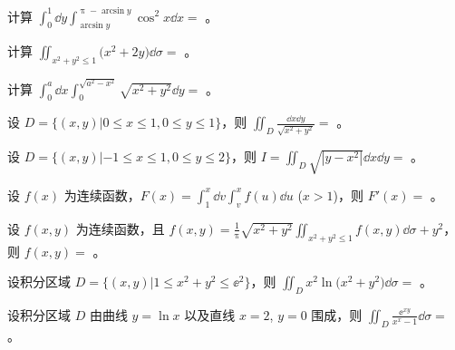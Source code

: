 \begin{ti}
	计算 $\int_0^1 \dd{y} \int_{\arcsin y}^{\uppi - \arcsin y} \cos^2 x \dd{x} = $ \hua。
\end{ti}

\begin{ti}
	计算 $\iint_{x^2+y^2 \leq 1} \bigl( x^2 + 2y \bigr) \dd{\sigma} = $ \hua。
\end{ti}

\begin{ti}
	计算 $\int_0^a \dd{x} \int_0^{\sqrt{a^2-x^2}} \sqrt{x^2 + y^2} \dd{y} = $ \hua。
\end{ti}

\begin{ti}
	设 $D = \{ (x,y) | 0 \leq x \leq 1,0 \leq y \leq 1 \}$，则 $\iint_{D} \frac{\dd{x}\dd{y}}{\sqrt{x^2+y^2}} = $ \hua。
\end{ti}

\begin{ti}
	设 $D = \{ (x,y) | -1 \leq x \leq 1,0 \leq y \leq 2 \}$，则 $I = \iint_{D} \sqrt{|y - x^2|} \dd{x}\dd{y} = $ \hua。
\end{ti}

\begin{ti}
	设 $f(x)$ 为连续函数，$F(x) = \int_1^x \dd{v} \int_v^x f(u) \dd{u}$ ($x > 1$)，则 $F'(x) = $ \hua。
\end{ti}

\begin{ti}
	设 $f(x,y)$ 为连续函数，且 $f(x,y) = \frac{1}{\uppi} \sqrt{x^2 + y^2} \iint_{x^2+y^2 \leq 1} f(x,y) \dd{\sigma} + y^2$，则 $f(x,y) = $ \hua。
\end{ti}

\begin{ti}
	设积分区域 $D = \bigl\{ (x,y) \bigl| 1 \leq x^2+y^2 \leq \ee^2 \bigr\}$，则 $\iint_{D} x^2 \ln \bigl(x^2+y^2\bigr) \dd{\sigma} = $ \hua。
\end{ti}

\begin{ti}
	设积分区域 $D$ 由曲线 $y = \ln x$ 以及直线 $x = 2$, $y = 0$ 围成，则 $\iint_{D} \frac{\ee^{xy}}{x^x - 1} \dd{\sigma} = $ \hua。
\end{ti}